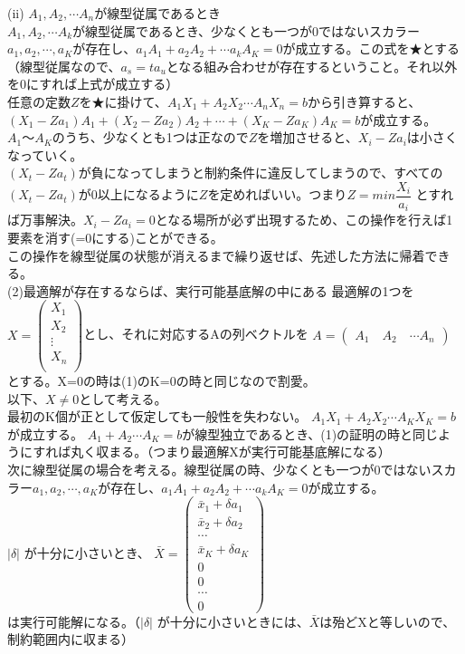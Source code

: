\documentclass[platex,dvipdfmx]{jlreq}			%
\begin{document}
(ii) $A_1,A_2, \cdots A_n$が線型従属であるとき\\
$A_1,A_2, \cdots A_k$が線型従属であるとき、少なくとも一つが0ではないスカラー$a_1,a_2, \cdots , a_K$が存在し、$a_1 A_1 + a_2 A_2 + \cdots a_k A_K=0$が成立する。この式を★とする\\
（線型従属なので、$a_s = t a_u$となる組み合わせが存在するということ。それ以外を0にすれば上式が成立する）\\
任意の定数$Z$を★に掛けて、$A_1 X_1 + A_2 X_2 \cdots A_n X_n = b$から引き算すると、\\
$(X_1 - Z a_1)A_1 + (X_2 - Z a_2)A_2 + \cdots + (X_K - Z a_K)A_K = b$が成立する。$A_1～A_K$のうち、少なくとも1つは正なので$Z$を増加させると、$X_i -Z a_i$は小さくなっていく。\\
$(X_t - Z a_t)$が負になってしまうと制約条件に違反してしまうので、すべての$(X_t - Z a_t)$が0以上になるように$Z$を定めればいい。つまり$Z = min \dfrac{X_i}{a_i}$ とすれば万事解決。$X_i - Z a_i=0$となる場所が必ず出現するため、この操作を行えば1要素を消す(=0にする)ことができる。\\
この操作を線型従属の状態が消えるまで繰り返せば、先述した方法に帰着できる。\\
(2)最適解が存在するならば、実行可能基底解の中にある
最適解の1つを
$X= \begin{pmatrix}
X_1 \\
X_2 \\
\vdots\\
X_n \\
\end{pmatrix}
$とし、それに対応するAの列ベクトルを
$A= \begin{pmatrix}
A_1 \quad A_2 \quad \cdots A_n
\end{pmatrix}
$
とする。X=0の時は(1)のK=0の時と同じなので割愛。\\
以下、$X \neq 0$として考える。\\
最初のK個が正として仮定しても一般性を失わない。
$A_1 X_1 + A_2 X_2 \cdots A_K X_K = b$が成立する。
$A_1 + A_2 \cdots A_K = b$が線型独立であるとき、(1)の証明の時と同じようにすれば丸く収まる。（つまり最適解Xが実行可能基底解になる）\\
次に線型従属の場合を考える。線型従属の時、少なくとも一つが0ではないスカラー$a_1,a_2, \cdots , a_K$が存在し、$a_1 A_1 + a_2 A_2 + \cdots a_k A_K=0$が成立する。\\
$|\delta|$ が十分に小さいとき、
$\bar{X}= \begin{pmatrix}
\bar{x}_1 + \delta a_1 \\
\bar{x}_2 + \delta a_2 \\
\cdots \\
\bar{x}_K + \delta a_K\\
0 \\
0 \\
\cdots \\
0
\end{pmatrix}
$\\
は実行可能解になる。（$|\delta|$ が十分に小さいときには、$\bar{X}$は殆どXと等しいので、制約範囲内に収まる）\\
\end{document}
